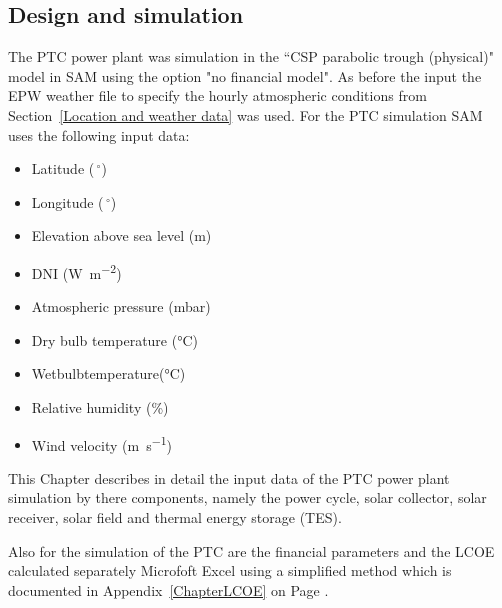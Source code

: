 \subsection{Design  and simulation} \label{PTC power plant design  and simulation}
The PTC power plant was simulation in the “CSP parabolic trough (physical)" model in SAM using the option "no financial model". As before the input the EPW weather file to specify the hourly atmospheric conditions from Section~\ref{Location and weather data} was used. For the PTC simulation SAM uses the following input data:
\begin{itemize}
\item Latitude ($\,^{\circ}$)
\item Longitude ($\,^{\circ}$)
\item Elevation above sea level (m)
\item DNI (\si{\watt\per\square\metre})
\item Atmospheric pressure (\si{\milli\bar})
\item Dry bulb temperature (\si{\celsius})
\item Wetbulbtemperature(\si{\celsius})
\item Relative humidity (\si{\percent})
\item Wind velocity (\si{\metre\per\second})
\end{itemize}
This Chapter describes in detail the input data of the PTC power plant simulation by there components, namely the  power cycle, solar collector, solar receiver, solar field and thermal energy storage (TES).

Also for the simulation of the PTC are the financial parameters and the LCOE calculated separately Microfoft Excel using a simplified method which is documented in Appendix~\ref{ChapterLCOE} on Page \pageref{ChapterLCOE}.
